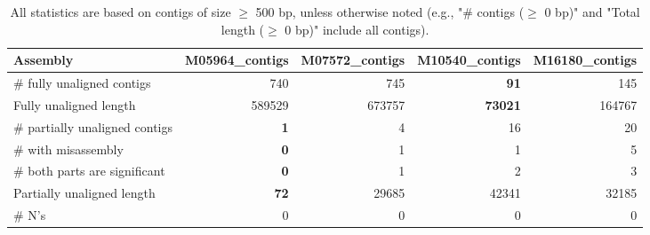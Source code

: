 \documentclass[12pt,a4paper]{article}
\begin{document}
\begin{table}[ht]
\begin{center}
\caption{All statistics are based on contigs of size $\geq$ 500 bp, unless otherwise noted (e.g., "\# contigs ($\geq$ 0 bp)" and "Total length ($\geq$ 0 bp)" include all contigs).}
\begin{tabular}{|l*{4}{|r}|}
\hline
Assembly & M05964\_contigs & M07572\_contigs & M10540\_contigs & M16180\_contigs \\ \hline
\# fully unaligned contigs & 740 & 745 & {\bf 91} & 145 \\ \hline
Fully unaligned length & 589529 & 673757 & {\bf 73021} & 164767 \\ \hline
\# partially unaligned contigs & {\bf 1} & 4 & 16 & 20 \\ \hline
\hspace{5mm}\# with misassembly & {\bf 0} & 1 & 1 & 5 \\ \hline
\hspace{5mm}\# both parts are significant & {\bf 0} & 1 & 2 & 3 \\ \hline
Partially unaligned length & {\bf 72} & 29685 & 42341 & 32185 \\ \hline
\# N's & 0 & 0 & 0 & 0 \\ \hline
\end{tabular}
\end{center}
\end{table}
\end{document}
